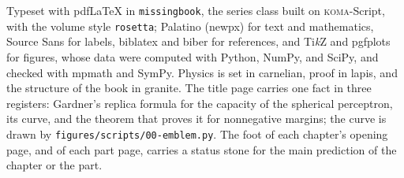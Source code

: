\medskip
{\small\noindent Typeset with pdf\LaTeX{} in \texttt{missingbook}, the series class built on \textsc{koma}-Script, with the volume style \texttt{rosetta}; Palatino (newpx) for text and mathematics, Source Sans for labels, biblatex and biber for references, and Ti\emph{k}Z and pgfplots for figures, whose data were computed with Python, NumPy, and SciPy, and checked with mpmath and SymPy. Physics is set in carnelian, proof in lapis, and the structure of the book in granite. The title page carries one fact in three registers: Gardner's replica formula for the capacity of the spherical perceptron, its curve, and the theorem that proves it for nonnegative margins; the curve is drawn by \texttt{figures/scripts/00-emblem.py}. The foot of each chapter's opening page, and of each part page, carries a status stone for the main prediction of the chapter or the part.\par}
